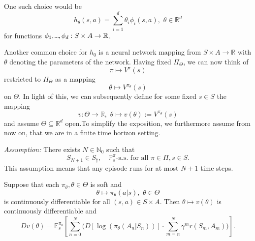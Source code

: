 One such choice would be 
\[
    h_\theta(s,a) = \sum_{i=1}^d \theta_i \phi_i(s,a), \,\, \theta \in \mathbb{R}^d
\]
for functions \( \phi_{1},\kern-0.10em.\kern-0.06em.\kern-0.06em.\kern-0.1em,\phi_d : S \times A \to \mathbb{R} \).

Another common choice for \( h_{0} \) is a neural network mapping from \( S \times A  \to \mathbb{R}\) with \( \theta \) denoting the parameters of the network. 
Having fixed \( \Pi_\Theta \), we can now think of 
\[
    \pi \mapsto V^\pi(s)
\]
restricted to \( \Pi_\Theta \) as a mapping 
\[
    \theta \mapsto V^{\pi_\theta}(s)
\] 
on \( \Theta \). In light of this, we can subsequently define for some fixed \( s \in S \) the mapping 
\[
    v: \Theta \to \mathbb{R}, \,\, \theta \mapsto v(\theta) := V^{\pi_\theta}(s)
\]
and assume \( \Theta \subseteq \mathbb{R}^d \) open.To simplify the exposition, we furthermore assume from now on, that we are in a finite time horizon setting.


\emph{Assumption:} There exists \( N \in \mathbb{N}_{0} \) such that 
\[
    S_{N+1} \in S_\dagger, \quad \mathbb{P}_s^\pi\text{-a.s.} \text{ for all } \pi \in \Pi, s \in S.
\]
This assumption means that any episode runs for at most 
\( N + 1 \) time steps.

\begin{theorem}
Suppose that each \( \pi_\theta, \theta \in \Theta\) is soft and
\[
    \theta \mapsto \pi_\theta(a|s), \,\, \theta \in \Theta
\]
is continuously differentiable for all \( (s,a) \in S \times A \). 
Then \( \theta \mapsto v(\theta) \) is continuously differentiable and
\[
    Dv(\theta) = \mathbb{E}_s^{\pi_\theta} \left[ \sum_{n = 0}^N \big( D \left[ \log(\pi_\theta(A_n | S_n)) \right] \cdot \sum_{m = n}^N \gamma^m r(S_m, A_m)\big) \right].
\]
\end{theorem}

